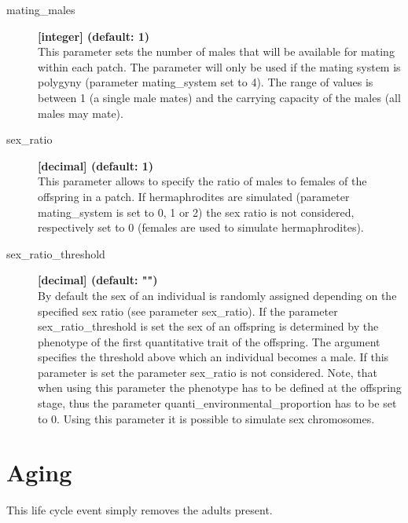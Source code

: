 \documentclass[letterpaper,12pt,oneside]{book}
\begin{document}
\begin{description}
\item[mating\_males] \textbf{[integer] (default: 1)}\\
This parameter sets the number of males that will be available for mating within each patch. The parameter will only be used if the mating system is polygyny (parameter \textsf{mating\_system} set to 4). The range of values is between 1 (a single male mates) and the carrying capacity of the males (all males may mate).

\item[sex\_ratio] \textbf{[decimal] (default: 1)}\\
This parameter allows to specify the ratio of males to females of the offspring in a patch. If hermaphrodites are simulated (parameter \textsf{mating\_system} is set to 0, 1 or 2) the sex ratio is not considered, respectively set to 0 (females are used to simulate hermaphrodites).

\item[sex\_ratio\_threshold] \textbf{[decimal] (default: "")}\\
By default the sex of an individual is randomly assigned depending on the specified sex ratio (see parameter \textsf{sex\_ratio}). If the parameter \textsf{sex\_ratio\_threshold} is set the sex of an offspring is determined by the phenotype of the first quantitative trait of the offspring. The argument specifies the threshold above which an individual becomes a male. If this parameter is set the parameter \textsf{sex\_ratio} is not considered. Note, that when using this parameter the phenotype has to be defined at the offspring stage, thus the parameter \textsf{quanti\_environmental\_proportion} has to be set to 0. Using this parameter it is possible to simulate sex chromosomes.  

\end{description}


\section{Aging}\label{4aging}
This life cycle event simply removes the adults present.
\end{document}

